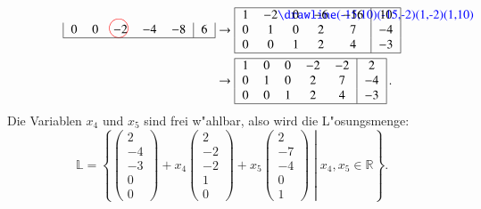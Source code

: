 \begin{beispiel}
\begin{align*}
\begin{tabular}{|>{$}c<{$}>{$}c<{$}>{$}c<{$}>{$}c<{$}>{$}c<{$}|>{$}c<{$}|}
   0&  0& -2%
\begin{picture}(0,0)
\color{red}\put(-7,4){\circle{15}}
\end{picture}%
& -4& -8&  6\\
\hline
\end{tabular}
&
\rightarrow
\begin{tabular}{|>{$}c<{$}>{$}c<{$}>{$}c<{$}>{$}c<{$}>{$}c<{$}|>{$}c<{$}|}
\hline
   1& -2%
\begin{picture}(0,0)
\color{blue}\drawline(-15,10)(-15,-2)(1,-2)(1,10)
\end{picture}%
&  0& -6&-16& 10\\
   0&  1&  0&  2&  7& -4\\
   0&  0&  1&  2&  4& -3\\
\hline
\end{tabular}
\\
&
\rightarrow
\begin{tabular}{|>{$}c<{$}>{$}c<{$}>{$}c<{$}>{$}c<{$}>{$}c<{$}|>{$}c<{$}|}
\hline
   1&  0&  0& -2& -2&  2\\
   0&  1&  0&  2&  7& -4\\
   0&  0&  1&  2&  4& -3\\
\hline
\end{tabular}\,.
\end{align*}
Die Variablen $x_4$ und $x_5$ sind frei w"ahlbar, also wird die 
L"osungsmenge:
\[
\mathbb L=
\left\{
\left.
\begin{pmatrix}2\\-4\\-3\\0\\0\end{pmatrix}
+x_4\begin{pmatrix}2\\-2\\-2\\1\\0\end{pmatrix}
+x_5\begin{pmatrix}2\\-7\\-4\\0\\1\end{pmatrix}
\;
\right|
\;
x_4,x_5\in\mathbb R
\right\}.
\]
\end{beispiel}


